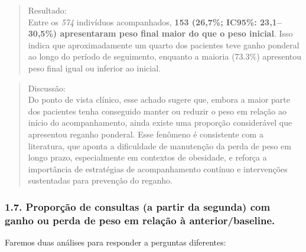 \documentclass[
]{article}
\begin{document}
\begin{quote}
Resultado:\\
Entre os \emph{574} indivíduos acompanhados, \textbf{153 (26,7\%;
IC95\%: 23,1--30,5\%) apresentaram peso final maior do que o peso
inicial}. Isso indica que aproximadamente um quarto dos pacientes teve
ganho ponderal ao longo do período de seguimento, enquanto a maioria
(73.3\%) apresentou peso final igual ou inferior ao inicial.\\
\end{quote}

\begin{quote}
Discussão:\\
Do ponto de vista clínico, esse achado sugere que, embora a maior parte
dos pacientes tenha conseguido manter ou reduzir o peso em relação ao
início do acompanhamento, ainda existe uma proporção considerável que
apresentou reganho ponderal. Esse fenômeno é consistente com a
literatura, que aponta a dificuldade de manutenção da perda de peso em
longo prazo, especialmente em contextos de obesidade, e reforça a
importância de estratégias de acompanhamento contínuo e intervenções
sustentadas para prevenção do reganho.
\end{quote}

\subsubsection{1.7. Proporção de consultas (a partir da segunda) com
ganho ou perda de peso em relação à
anterior/baseline.}\label{proporuxe7uxe3o-de-consultas-a-partir-da-segunda-com-ganho-ou-perda-de-peso-em-relauxe7uxe3o-uxe0-anteriorbaseline.}

Faremos duas análises para responder a perguntas diferentes:
\end{document}
